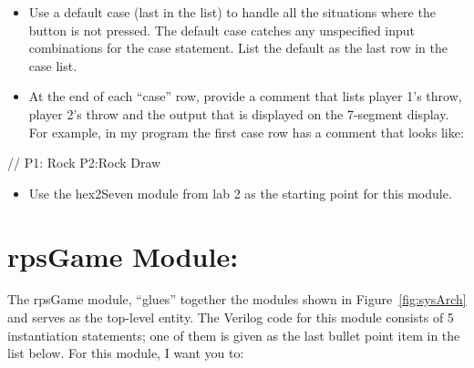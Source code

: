 \begin{itemize}
\item
  Use a default case (last in the list) to handle all the situations
  where the button is not pressed. The default case catches any
  unspecified input combinations for the case statement. List the
  default as the last row in the case list.
\item
  At the end of each ``case'' row, provide a comment that lists player
  1's throw, player 2's throw and the output that is displayed on the
  7-segment display. For example, in my program the first case row has a
  comment that looks like:
\end{itemize}

// P1: Rock P2:Rock Draw

\begin{itemize}
\item
  Use the hex2Seven module from lab 2 as the starting point for this
  module.
\end{itemize}

\hypertarget{rpsgame-module}{%
\section{rpsGame Module:}
\label{rpsgame-module}}

The rpsGame module, ``glues'' together the modules shown in Figure~\ref{fig:sysArch} and
serves as the top-level entity. The Verilog code for this module
consists of 5 instantiation statements; one of them is given as the last
bullet point item in the list below. For this module, I want you to:

